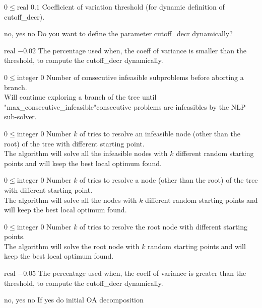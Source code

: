 %
{$0\leq\textrm{real}$}%
{$0.1$}%
{Coefficient of variation threshold (for dynamic definition of cutoff\_decr).}%
{}

%
{\ttfamily no, yes}%
{no}%
{Do you want to define the parameter cutoff\_decr dynamically?}%
{
}

%
{$\textrm{real}$}%
{$-0.02$}%
{The percentage used when, the coeff of variance is smaller than the threshold, to compute the cutoff\_decr dynamically.}%
{}

%
{$0\leq\textrm{integer}$}%
{$0$}%
{Number of consecutive infeasible subproblems before aborting a branch.\\
Will continue exploring a branch of the tree until "max\_consecutive\_infeasible"consecutive problems are infeasibles by the NLP sub-solver.}%
{}

%
{$0\leq\textrm{integer}$}%
{$0$}%
{Number $k$ of tries to resolve an infeasible node (other than the root) of the tree with different starting point.\\
The algorithm will solve all the infeasible nodes with $k$ different random starting points and will keep the best local optimum found.}%
{}

%
{$0\leq\textrm{integer}$}%
{$0$}%
{Number $k$ of tries to resolve a node (other than the root) of the tree with different starting point.\\
The algorithm will solve all the nodes with $k$ different random starting points and will keep the best local optimum found.}%
{}

%
{$0\leq\textrm{integer}$}%
{$0$}%
{Number $k$ of tries to resolve the root node with different starting points.\\
The algorithm will solve the root node with $k$ random starting points and will keep the best local optimum found.}%
{}

%
{$\textrm{real}$}%
{$-0.05$}%
{The percentage used when, the coeff of variance is greater than the threshold, to compute the cutoff\_decr dynamically.}%
{}

%
{\ttfamily no, yes}%
{no}%
{If yes do initial OA decomposition}%
{}

